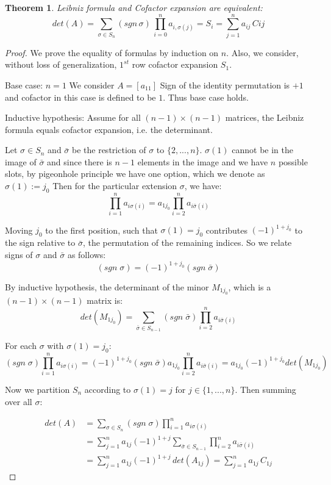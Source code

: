 \documentclass[12pt]{article}
\newtheorem{theorem}{Theorem}
\numberwithin{theorem}{section}
\numberwithin{equation}{theorem}
\begin{document}
\begin{theorem}
    Leibniz formula and Cofactor expansion are equivalent:
    $$det(A) = \sum_{\sigma \in S_n}(sgn \,\sigma)\,\prod_{i = 0}^na_{i, \sigma(j)} = S_i = \sum_{j = 1}^n a_{ij}\,C{ij}$$ 
\end{theorem}
\begin{proof}
    We prove the equality of formulas by induction on $n$. Also, we consider, without loss of generalization, $1^{st}$ row cofactor expansion $S_1$.
    
    Base case: $n = 1$
    We consider $A = [a_{11}]$
    Sign of the identity permutation is $+1$ and cofactor in this case is defined to be $1$. Thus base case holds.

    Inductive hypothesis:
    Assume for all $(n-1)\times(n-1)$ matrices, the Leibniz formula equals cofactor expansion, i.e. the determinant.

    Let $\sigma \in S_n$ and $\bar{\sigma}$ be the restriction of $\sigma$ to $\{2, ..., n\}$. $\sigma(1)$ cannot be in the image of $\bar{\sigma}$ and since there is $n-1$ elements in the image and we have $n$ possible slots, by pigeonhole principle we have one option, which we denote as $\sigma(1) := j_0$ 
    Then for the particular extension $\sigma$, we have:
    $$
    \prod_{i = 1}^na_{i\sigma(i)} = a_{1j_0}\prod_{i = 2}^n a_{i\bar{\sigma}(i)}
    $$

    Moving $j_0$ to the first position, such that $\sigma(1) = j_0$ contributes $(-1)^{1+j_0}$ to the sign relative to $\bar{\sigma}$, the permutation of the remaining indices. So we relate signs of $\sigma$ and $\bar{\sigma}$ as follows:
    $$(sgn\;\sigma) = (-1)^{1+j_0}(sgn\;\bar{\sigma})$$ 

    By inductive hypothesis, the determinant of the minor $M_{1j_0}$, which is a $(n - 1) \times (n - 1)$ matrix is:
    $$det(M_{1j_0}) = \sum_{\bar{\sigma} \in S_{n-1}}(sgn\;\bar{\sigma})\prod_{i = 2}^n a_{i \bar{\sigma}(i)}$$

    For each $\sigma$ with $\sigma(1) = j_0$:
    $$
    (sgn\;\sigma)\prod_{i=1}^n a_{i\sigma(i)} = (-1)^{1+j_0}(sgn\;\bar{\sigma}) a_{1j_0} \prod_{i = 2}^n a_{i \bar{\sigma}(i)} = a_{1j_0} (-1)^{1+j_0}det(M_{1j_0})
    $$

    Now we partition $S_n$ according to $\sigma(1) = j$ for $j \in \{1, ..., n\}$. Then summing over all $\sigma$:

    \begin{align*}
        det(A) &= \sum_{\sigma \in S_n}(sgn\;\sigma)\prod_{i = 1}^n a_{i\sigma(i)}\\
        &= \sum_{j = 1}^n a_{1j}(-1)^{1+j} \sum_{\bar{\sigma} \in S_{n-1}} \prod_{i = 2}^n a_{i\bar{\sigma}(i)}\\
        &= \sum_{j = 1}^n a_{1j}(-1)^{1+j}\,det(A_{1j}) = \sum_{j = 1}^n a_{1j}\,C_{1j} 
    \end{align*}
\end{proof}
\end{document}
